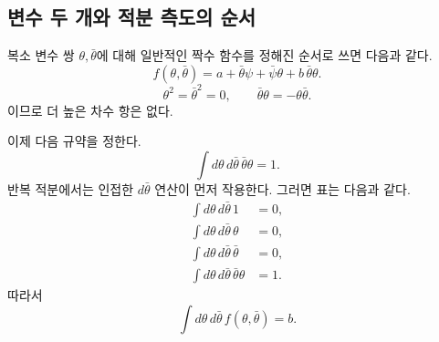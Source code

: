 \subsection{변수 두 개와 적분 측도의 순서}

복소 변수 쌍 \(\theta,\bar\theta\)에 대해 일반적인 짝수 함수를 정해진 순서로 쓰면 다음과 같다.
\begin{equation}
f(\theta,\bar\theta)
=a+\bar\theta\psi+\bar\psi\theta+b\,\bar\theta\theta.
\end{equation}
\begin{equation}
\theta^2=\bar\theta^2=0,
\qquad
\bar\theta\theta=-\theta\bar\theta.
\end{equation}이므로 더 높은 차수 항은 없다.

이제 다음 규약을 정한다.
\begin{equation}
\int d\theta\,d\bar\theta\,
\bar\theta\theta=1.
\end{equation}
반복 적분에서는 인접한 \(d\bar\theta\) 연산이 먼저 작용한다. 그러면 표는 다음과 같다.
\begin{align}
\int d\theta\,d\bar\theta\,1&=0,\\
\int d\theta\,d\bar\theta\,\theta&=0,\\
\int d\theta\,d\bar\theta\,\bar\theta&=0,\\
\int d\theta\,d\bar\theta\,\bar\theta\theta&=1.
\end{align}
따라서
\begin{equation}
\int d\theta\,d\bar\theta\,
f(\theta,\bar\theta)=b.
\end{equation}

\begin{classroomqa}
\end{classroomqa}

\begin{classroomqa}\end{classroomqa}

